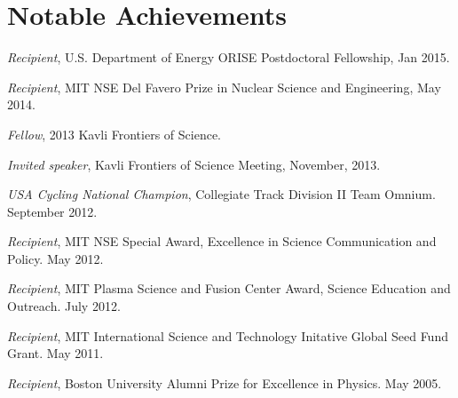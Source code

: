 \documentclass[10pt]{article}
\begin{document}
\section{Notable Achievements}
\begin{innerlist}
\item \textit{Recipient}, U.S. Department of Energy ORISE Postdoctoral Fellowship, Jan 2015.
\item \textit{Recipient}, MIT NSE Del Favero Prize in Nuclear Science and Engineering, May 2014.
\item \textit{Fellow}, 2013 Kavli Frontiers of Science.
\item \textit{Invited speaker}, Kavli Frontiers of Science Meeting, November, 2013.
\item \textit{USA Cycling National Champion}, Collegiate Track Division II Team Omnium. September 2012.
\item \textit{Recipient}, MIT NSE Special Award, Excellence in Science Communication and Policy. May 2012.
\item \textit{Recipient}, MIT Plasma Science and Fusion Center Award, Science Education and Outreach. July 2012.
\item \textit{Recipient}, MIT International Science and Technology Initative Global Seed Fund Grant. May 2011.
\item \textit{Recipient}, Boston University Alumni Prize for Excellence in Physics. May 2005.
\end{innerlist}
\end{document}
